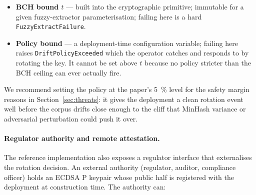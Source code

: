 \begin{itemize}
  \item \textbf{BCH bound $t$} — built into the cryptographic
        primitive; immutable for a given fuzzy\nobreakdash-extractor
        parameterisation; failing here is a hard
        \texttt{FuzzyExtractFailure}.
  \item \textbf{Policy bound} — a deployment\nobreakdash-time
        configuration variable; failing here raises
        \texttt{DriftPolicyExceeded} which the operator catches and
        responds to by rotating the key.  It cannot be set above $t$
        because no policy stricter than the BCH ceiling can ever
        actually fire.
\end{itemize}

We recommend setting the policy at the paper's \SI{5}{\percent}
level for the safety margin reasons in
Section~\ref{sec:threats}: it gives the deployment a clean rotation
event well before the corpus drifts close enough to the cliff that
MinHash variance or adversarial perturbation could push it over.

\paragraph{Regulator authority and remote attestation.}  The
reference implementation also exposes a regulator interface that
externalises the rotation decision.  An external authority
(regulator, auditor, compliance officer) holds an ECDSA P
keypair whose public half is registered with the deployment at
construction time.  The authority can:

